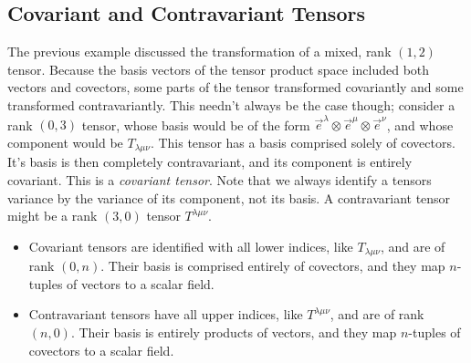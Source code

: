 \subsection{Covariant and Contravariant Tensors}
The previous example discussed the transformation of a mixed, rank $(1,2)$ tensor.
Because the basis vectors of the tensor product space included both vectors and covectors, some parts of the tensor transformed covariantly and some transformed contravariantly.
This needn't always be the case though; consider a rank $(0,3)$ tensor, whose basis would be of the form $\vec{e}^\lambda \otimes \vec{e}^\mu \otimes \vec{e}^\nu$, and whose component would be $T_{\lambda\mu\nu}$.
This tensor has a basis comprised solely of covectors.
It's basis is then completely contravariant, and its component is entirely covariant.
This is a \emph{covariant tensor}.
Note that we always identify a tensors variance by the variance of its component, not its basis.
A contravariant tensor might be a rank $(3,0)$ tensor $T^{\lambda\mu\nu}$.
\begin{itemize}
    \item Covariant tensors are identified with all lower indices, like $T_{\lambda\mu\nu}$, and are of rank $(0,n)$. Their basis is comprised entirely of covectors, and they map $n$-tuples of vectors to a scalar field.
    \item Contravariant tensors have all upper indices, like $T^{\lambda\mu\nu}$, and are of rank $(n,0)$. Their basis is entirely products of vectors, and they map $n$-tuples of covectors to a scalar field.
\end{itemize}

